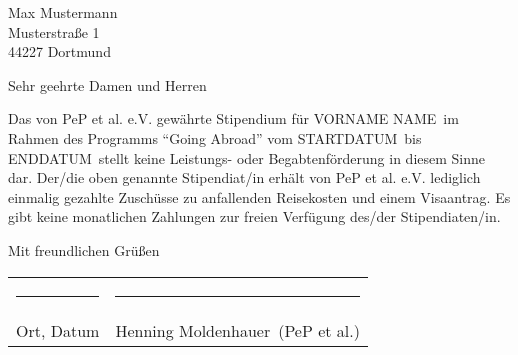 \documentclass[
  pepbrief,
  fontsize=12pt,
  paper=a4,
  DIV=14,
  parskip=half,
  backaddress=false,
]{scrlttr2}
\newcommand\stipendiat{VORNAME NAME}  %
\newcommand\stipstart{STARTDATUM}     %
\newcommand\stipende{ENDDATUM}        %
\newcommand\vorsitzender{Henning Moldenhauer}
\begin{document}
\begin{letter}{%
  Max Mustermann\\
  Musterstraße 1\\
  44227 Dortmund%
}
\opening{Sehr geehrte Damen und Herren}

Das von PeP et al. e.V. gewährte Stipendium für \stipendiat\ im Rahmen des Programms \enquote{Going Abroad} vom \stipstart\ bis \stipende\ stellt keine Leistungs- oder Begabtenförderung in diesem Sinne dar.
Der/die oben genannte Stipendiat/in erhält von PeP et al. e.V. lediglich einmalig gezahlte Zuschüsse zu anfallenden Reisekosten und einem Visaantrag.
Es gibt keine monatlichen Zahlungen zur freien Verfügung des/der Stipendiaten/in.

\closing{Mit freundlichen Grüßen}
\begin{tabular}{@{}p{}@{}p{}@{}}%
\rule{6cm}{1pt} & \rule{7cm}{1pt} \\
Ort, Datum & \vorsitzender\ (PeP et al.) \\[2cm]
\end{tabular}

\end{letter}
\end{document}
